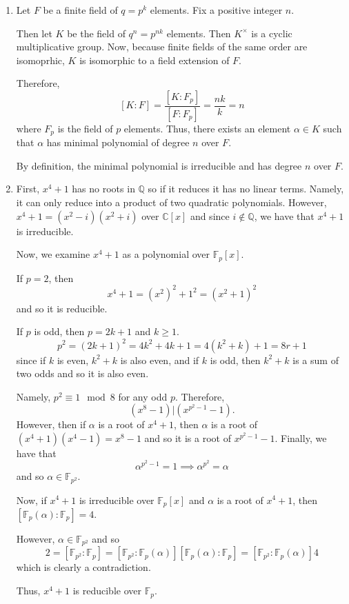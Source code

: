 \documentclass[12pt]{Qual}
\begin{document}
\begin{solution}$\,$
\begin{enumerate}[label=(\alph*)]
    \item Let $F$ be a finite field of $q=p^k$ elements. Fix a positive integer $n$.

    Then let $K$ be the field of $q^n=p^{nk}$ elements. Then $K^\times$ is a cyclic multiplicative group. Now, because finite fields of the same order are isomoprhic, $K$ is isomorphic to a field extension of $F.$

    Therefore, $$[K:F]=\frac{[K:F_p]}{[F:F_p]}=\frac{nk}{k}=n$$ where $F_p$ is the field of $p$ elements. Thus, there exists an element $\alpha\in K$ such that $\alpha$ has minimal polynomial of degree $n$ over $F.$

    By definition, the minimal polynomial is irreducible and has degree $n$ over $F.$

    \item First, $x^4+1$ has no roots in $\mathbb{Q}$ so if it reduces it has no linear terms. Namely, it can only reduce into a product of two quadratic polynomials. However, $x^4+1=(x^2-i)(x^2+i)$ over $\mathbb{C}[x]$ and since $i\notin\mathbb{Q}$, we have that $x^4+1$ is irreducible.

    Now, we examine $x^4+1$ as a polynomial over $\mathbb{F}_p[x]$.

    If $p=2$, then $$x^4+1=(x^2)^2+1^2=(x^2+1)^2$$ and so it is reducible.

    If $p$ is odd, then $p=2k+1$ and $k\ge1$. $$p^2=(2k+1)^2=4k^2+4k+1=4(k^2+k)+1=8r+1$$ since if $k$ is even, $k^2+k$ is also even, and if $k$ is odd, then $k^2+k$ is a sum of two odds and so it is also even.

    Namely, $p^2\equiv 1\mod 8$ for any odd $p.$ Therefore, $$(x^8-1)|(x^{p^2-1}-1).$$ However, then if $\alpha$ is a root of $x^4+1$, then $\alpha$ is a root of $(x^4+1)(x^4-1)=x^8-1$ and so it is a root of $x^{p^2-1}-1$. Finally, we have that $$\alpha^{p^2-1}=1\implies \alpha^{p^2}=\alpha$$ and so $\alpha\in\mathbb{F}_{p^2}.$

     Now, if $x^4+1$ is irreducible over $\mathbb{F}_p[x]$ and $\alpha$ is a root of $x^4+1$, then $[\mathbb{F}_p(\alpha):\mathbb{F}_p]=4$.

    However, $\alpha\in \mathbb{F}_{p^2}$ and so $$2=[\mathbb{F}_{p^2}:\mathbb{F}_p]=[\mathbb{F}_{p^2}:\mathbb{F}_p(\alpha)][\mathbb{F}_p(\alpha):\mathbb{F}_p]=[\mathbb{F}_{p^2}:\mathbb{F}_p(\alpha)]4$$ which is clearly a contradiction.

    Thus, $x^4+1$ is reducible over $\mathbb{F}_p$.
\end{enumerate}
\end{solution}
\newpage
\end{document}
